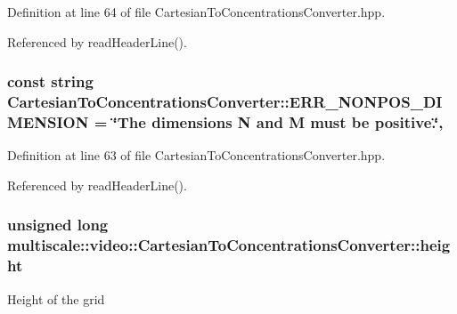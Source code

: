 Definition at line 64 of file Cartesian\-To\-Concentrations\-Converter.\-hpp.



Referenced by read\-Header\-Line().

\hypertarget{classmultiscale_1_1video_1_1CartesianToConcentrationsConverter_a5581717e5d7af582462abe8b38aa4650}{
\subsubsection[{E\-R\-R\-\_\-\-N\-O\-N\-P\-O\-S\-\_\-\-D\-I\-M\-E\-N\-S\-I\-O\-N}]{\setlength{\rightskip}{0pt plus 5cm}const string Cartesian\-To\-Concentrations\-Converter\-::\-E\-R\-R\-\_\-\-N\-O\-N\-P\-O\-S\-\_\-\-D\-I\-M\-E\-N\-S\-I\-O\-N = \char`\"{}The dimensions N and M must be positive.\char`\"{}\hspace{0.3cm}{\ttfamily [static]}, {\ttfamily [private]}}}\label{classmultiscale_1_1video_1_1CartesianToConcentrationsConverter_a5581717e5d7af582462abe8b38aa4650}


Definition at line 63 of file Cartesian\-To\-Concentrations\-Converter.\-hpp.



Referenced by read\-Header\-Line().

\hypertarget{classmultiscale_1_1video_1_1CartesianToConcentrationsConverter_a94e58072f2e143bd6476133370ffb37f}{
\subsubsection[{height}]{\setlength{\rightskip}{0pt plus 5cm}unsigned long multiscale\-::video\-::\-Cartesian\-To\-Concentrations\-Converter\-::height\hspace{0.3cm}{\ttfamily [private]}}}\label{classmultiscale_1_1video_1_1CartesianToConcentrationsConverter_a94e58072f2e143bd6476133370ffb37f}
Height of the grid 

